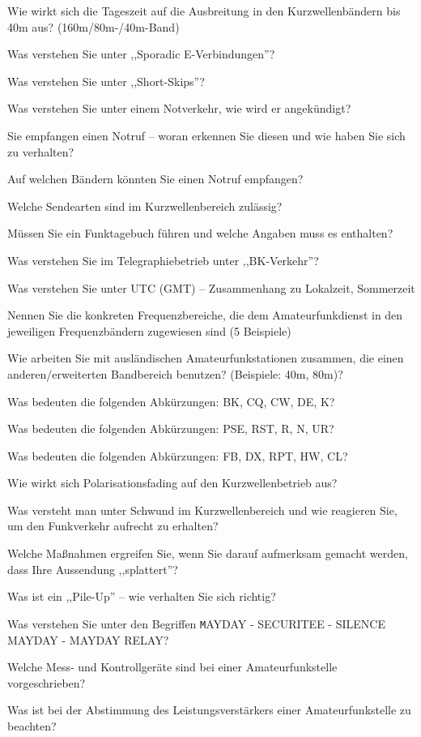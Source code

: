 \documentclass[avery5371,grid,frame,a4paper]{flashcards}
\newcommand\question[2]{
  \begin{flashcard}[{\chap} -- #1]{#2}\end{flashcard}
}
\begin{document}
\question{30}{Wie wirkt sich die Tageszeit auf die Ausbreitung in den Kurzwellenbändern bis 40m aus? (160m/80m-/40m-Band)}
\question{31}{Was verstehen Sie unter ,,Sporadic E-Verbindungen''?}
\question{32}{Was verstehen Sie unter ,,Short-Skips''?}
\question{33}{Was verstehen Sie unter einem Notverkehr, wie wird er angekündigt?}
\question{34}{Sie empfangen einen Notruf – woran erkennen Sie diesen und wie haben Sie sich zu verhalten?}
\question{35}{Auf welchen Bändern könnten Sie einen Notruf empfangen?}
\question{36}{Welche Sendearten sind im Kurzwellenbereich zulässig?}
\question{37}{Müssen Sie ein Funktagebuch führen und welche Angaben muss es enthalten?}
\question{38}{Was verstehen Sie im Telegraphiebetrieb unter ,,BK-Verkehr''?}
\question{39}{Was verstehen Sie unter UTC (GMT) -- Zusammenhang zu Lokalzeit, Sommerzeit}
\question{40}{Nennen Sie die konkreten Frequenzbereiche, die dem Amateurfunkdienst in den jeweiligen Frequenzbändern zugewiesen sind (5 Beispiele)}
\question{41}{Wie arbeiten Sie mit ausländischen Amateurfunkstationen zusammen, die einen anderen/erweiterten Bandbereich benutzen? (Beispiele: 40m, 80m)?}
\question{42}{Was bedeuten die folgenden Abkürzungen: BK, CQ, CW, DE, K?}
\question{42}{Was bedeuten die folgenden Abkürzungen: PSE, RST, R, N, UR?}
\question{42}{Was bedeuten die folgenden Abkürzungen: FB, DX, RPT, HW, CL?}
\question{43}{Wie wirkt sich Polarisationsfading auf den Kurzwellenbetrieb aus?}
\question{44}{Was versteht man unter Schwund im Kurzwellenbereich und wie reagieren Sie, um den Funkverkehr aufrecht zu erhalten?}
\question{45}{Welche Maßnahmen ergreifen Sie, wenn Sie darauf aufmerksam gemacht werden, dass Ihre Aussendung ,,splattert''?}
\question{46}{Was ist ein ,,Pile-Up'' -- wie verhalten Sie sich richtig?}
\question{47}{Was verstehen Sie unter den Begriffen {\footnotesize\texttt MAYDAY - SECURITEE - SILENCE MAYDAY - MAYDAY RELAY?}}
\question{48}{Welche Mess- und Kontrollgeräte sind bei einer Amateurfunkstelle vorgeschrieben?}
\question{49}{Was ist bei der Abstimmung des Leistungsverstärkers einer Amateurfunkstelle zu beachten?}
\end{document}
